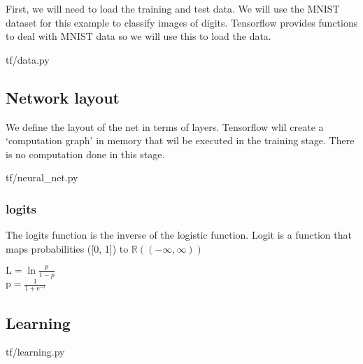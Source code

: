 \documentclass[11pt,a4paper]{article}
\begin{document}
First, we will need to load the training and test data.
We will use the MNIST dataset for this example to classify images of digits.
Tensorflow provides functions to deal with MNIST data so we will use this to
load the data.


{tf/data.py}

\newpage
\subsection{Network layout}

We define the layout of the net in terms of layers.
Tensorflow wlil create a `computation graph' in memory that wil be executed
in the training stage. There is no computation done in this stage.


{tf/neural_net.py}

\subsubsection{logits}
The logits function is the inverse of the logistic function.
Logit is a function that maps probabilities ([0, 1]) to $\mathbb{R} ((-\infty, \infty))$

$\mathrm{L} = \ln{\frac{p}{1 - p}}$\\
$\mathrm{p} = \frac{1}{1 + \mathrm{e}^{-l}}$


\newpage
\subsection{Learning}

{tf/learning.py}
\end{document}
